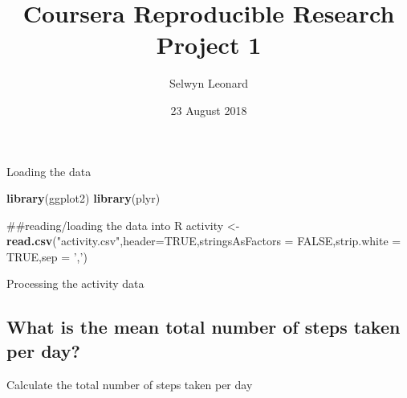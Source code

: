 \documentclass[]{article}
\title{Coursera Reproducible Research Project 1}
\author{Selwyn Leonard}
\date{23 August 2018}
\newenvironment{Shaded}{\begin{snugshade}}{\end{snugshade}}
\newcommand{\KeywordTok}[1]{\textcolor[rgb]{0.13,0.29,0.53}{\textbf{#1}}}
\newcommand{\DataTypeTok}[1]{\textcolor[rgb]{0.13,0.29,0.53}{#1}}
\newcommand{\StringTok}[1]{\textcolor[rgb]{0.31,0.60,0.02}{#1}}
\newcommand{\OtherTok}[1]{\textcolor[rgb]{0.56,0.35,0.01}{#1}}
\newcommand{\OperatorTok}[1]{\textcolor[rgb]{0.81,0.36,0.00}{\textbf{#1}}}
\newcommand{\NormalTok}[1]{#1}
\begin{document}
\maketitle

Loading the data

\begin{Shaded}
\begin{Highlighting}[]
\KeywordTok{library}\NormalTok{(ggplot2)}
\KeywordTok{library}\NormalTok{(plyr)}

\NormalTok{##reading/loading the data into R}
\NormalTok{activity <-}\StringTok{ }\KeywordTok{read.csv}\NormalTok{(}\StringTok{"activity.csv"}\NormalTok{,}\DataTypeTok{header=}\OtherTok{TRUE}\NormalTok{,}\DataTypeTok{stringsAsFactors =} \OtherTok{FALSE}\NormalTok{,}\DataTypeTok{strip.white =} 
           \OtherTok{TRUE}\NormalTok{,}\DataTypeTok{sep =} \StringTok{','}\NormalTok{)}
\end{Highlighting}
\end{Shaded}

Processing the activity data

\begin{Shaded}
\end{Shaded}

\subsection{What is the mean total number of steps taken per
day?}\label{what-is-the-mean-total-number-of-steps-taken-per-day}

Calculate the total number of steps taken per day

\begin{Shaded}
\end{Shaded}
\end{document}
